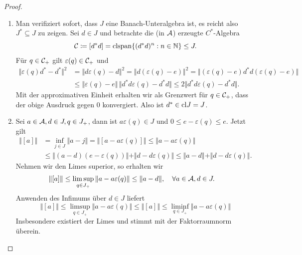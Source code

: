 \begin{proof}{\ }
    \begin{enumerate}
        \item Man verifiziert sofort, dass $J$ eine Banach-Unteralgebra ist, es reicht also $J^* \subseteq J$ zu zeigen. Sei $d \in J$ und betrachte die (in $\mathcal{A}$) erzeugte $C^*$-Algebra
        $$ \mathcal{C} \coloneqq [{d^* d}] = \mathrm{clspan} \{ (d^* d)^n : n \in \mathbb{N} \} \leq J. $$
        Für $q \in \mathcal{C}_+$ gilt $\varepsilon(q) \in \mathcal{C}_+$ und
        \begin{align*}
            \Vert \varepsilon(q) d^* - d^* \Vert^2
            &=
            \Vert d \varepsilon(q) - d \Vert^2
            =
            \Vert d (\varepsilon(q) - e) \Vert^2
            =
            \Vert (\varepsilon(q) - e) d^* d (\varepsilon(q) - e) \Vert \\
            &\leq
            \Vert \varepsilon(q) - e \Vert \, \Vert d^* d \varepsilon(q) - d^* d \Vert
            \leq
            2 \Vert d^* d \varepsilon(q) - d^* d \Vert.
        \end{align*}
        Mit der approximativen Einheit erhalten wir als Grenzwert für $q \in \mathcal{C}_+$, dass der obige Ausdruck gegen $0$ konvergiert. Also ist $d^* \in \mathrm{cl}{J} = J$.

        \item Sei $a \in \mathcal{A}, d \in J, q \in J_+$, dann ist $a \varepsilon(q) \in J$ und $0 \leq e - \varepsilon(q) \leq e$. Jetzt gilt
        \begin{align*}
            \Vert [a] \Vert
            &=
            \inf_{j \in J} \Vert a - j \Vert
            =
            \Vert [a - a \varepsilon(q) ] \Vert
            \leq 
            \Vert a - a \varepsilon(q) \Vert \\
            &\leq
            \Vert (a - d)(e - \varepsilon(q)) \Vert + \Vert d - d \varepsilon(q) \Vert
            \leq
            \Vert a - d \Vert + \Vert d - d \varepsilon(q) \Vert.
        \end{align*}
        Nehmen wir den Limes superior, so erhalten wir
        \begin{align*}
            \Vert [a] \Vert
            &\leq
            \limsup_{q \in J_+} \Vert a - a \varepsilon(q) \Vert
            \leq
            \Vert a - d \Vert, \quad \forall a \in \mathcal{A}, d \in J.
        \end{align*}
        Anwenden des Infimums über $d \in J$ liefert
        \[
            \Vert [a] \Vert
            \leq
            \limsup_{q \in J_+} \Vert a - a \varepsilon(q) \Vert
            \leq
            \Vert [a] \Vert
            \leq
            \liminf_{q \in J_+} \Vert a - a \varepsilon(q) \Vert
        \]
        Insbesondere existiert der Limes und stimmt mit der Faktorraumnorm überein.


\end{enumerate}
\end{proof}
